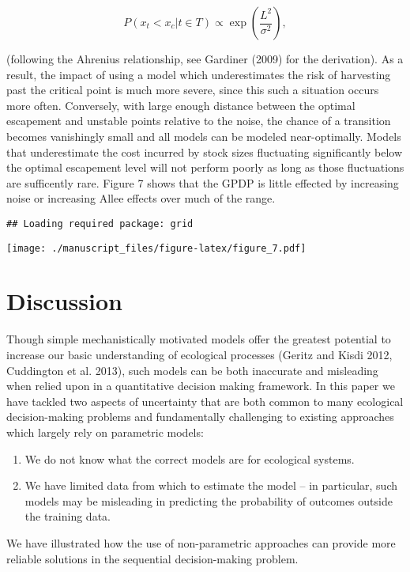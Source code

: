 \documentclass[]{components/elsarticle}
\begin{document}
\[P(x_t < x_c | t \in T) \propto  \exp\left(\frac{L^2}{\sigma^2}\right),\]

(following the Ahrenius relationship, see Gardiner (2009) for the
derivation). As a result, the impact of using a model which
underestimates the risk of harvesting past the critical point is much
more severe, since this such a situation occurs more often. Conversely,
with large enough distance between the optimal escapement and unstable
points relative to the noise, the chance of a transition becomes
vanishingly small and all models can be modeled near-optimally. Models
that underestimate the cost incurred by stock sizes fluctuating
significantly below the optimal escapement level will not perform poorly
as long as those fluctuations are sufficently rare. Figure 7 shows that
the GPDP is little effected by increasing noise or increasing Allee
effects over much of the range.

\begin{verbatim}
## Loading required package: grid
\end{verbatim}

\texttt{[image: ./manuscript\_files/figure-latex/figure\_7.pdf]}

\section{Discussion}\label{discussion}

Though simple mechanistically motivated models offer the greatest
potential to increase our basic understanding of ecological processes
(Geritz and Kisdi 2012, Cuddington et al. 2013), such models can be both
inaccurate and misleading when relied upon in a quantitative decision
making framework. In this paper we have tackled two aspects of
uncertainty that are both common to many ecological decision-making
problems and fundamentally challenging to existing approaches which
largely rely on parametric models:

\begin{enumerate}
\def\labelenumi{\arabic{enumi}.}
\itemsep1pt\parskip0pt
\item
  We do not know what the correct models are for ecological systems.
\item
  We have limited data from which to estimate the model -- in
  particular, such models may be misleading in predicting the
  probability of outcomes outside the training data.
\end{enumerate}

We have illustrated how the use of non-parametric approaches can provide
more reliable solutions in the sequential decision-making problem.
\end{document}
